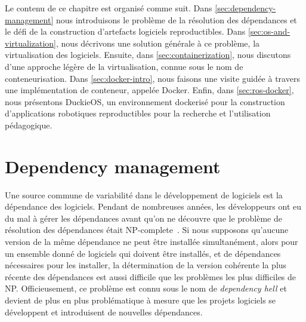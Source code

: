 Le contenu de ce chapitre est organisé comme suit. Dans \autoref{sec:dependency-management} nous introduisons le problème de la résolution des dépendances et le défi de la construction d'artefacts logiciels reproductibles. Dans \autoref{sec:os-and-virtualization}, nous décrivons une solution générale à ce problème, la virtualisation des logiciels. Ensuite, dans \autoref{sec:containerization}, nous discutons d'une approche légère de la virtualisation, connue sous le nom de conteneurisation. Dans \autoref{sec:docker-intro}, nous faisons une visite guidée à travers une implémentation de conteneur, appelée Docker. Enfin, dans \autoref{sec:ros-docker}, nous présentons DuckieOS, un environnement dockerisé pour la construction d'applications robotiques reproductibles pour la recherche et l'utilisation pédagogique.

\section{Dependency management}\label{sec:dependency-management}

Une source commune de variabilité dans le développement de logiciels est la dépendance des logiciels. Pendant de nombreuses années, les développeurs ont eu du mal à gérer les dépendances avant qu'on ne découvre que le problème de résolution des dépendances était NP-complete~\citep{abate2012dependency}. Si nous supposons qu'aucune version de la même dépendance ne peut être installée simultanément, alors pour un ensemble donné de logiciels qui doivent être installés, et de dépendances nécessaires pour les installer, la détermination de la version cohérente la plus récente des dépendances est aussi difficile que les problèmes les plus difficiles de NP. Officieusement, ce problème est connu sous le nom de \textit{dependency hell} et devient de plus en plus problématique à mesure que les projets logiciels se développent et introduisent de nouvelles dépendances.

